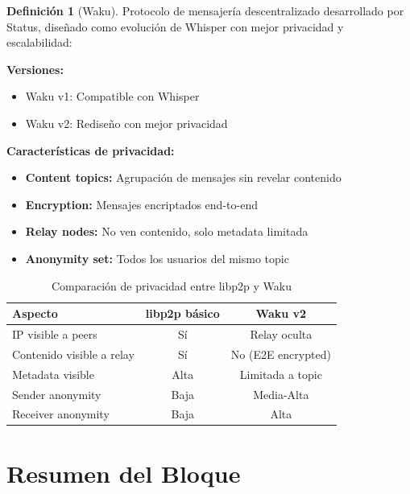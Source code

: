 \documentclass[11pt,a4paper,twoside]{book}
\theoremstyle{definition}
\newtheorem{definition}{Definición}[chapter]
\theoremstyle{remark}
\begin{document}
\begin{definition}[Waku]
Protocolo de mensajería descentralizado desarrollado por Status, diseñado como evolución de Whisper con mejor privacidad y escalabilidad:

\textbf{Versiones:}
\begin{itemize}
    \item Waku v1: Compatible con Whisper
    \item Waku v2: Rediseño con mejor privacidad
\end{itemize}

\textbf{Características de privacidad:}
\begin{itemize}
    \item \textbf{Content topics:} Agrupación de mensajes sin revelar contenido
    \item \textbf{Encryption:} Mensajes encriptados end-to-end
    \item \textbf{Relay nodes:} No ven contenido, solo metadata limitada
    \item \textbf{Anonymity set:} Todos los usuarios del mismo topic
\end{itemize}
\end{definition}

\begin{table}[htbp]
\centering
\small
\begin{tabular}{lcc}
\toprule
\textbf{Aspecto} & \textbf{libp2p básico} & \textbf{Waku v2} \\
\midrule
IP visible a peers & Sí & Relay oculta \\
Contenido visible a relay & Sí & No (E2E encrypted) \\
Metadata visible & Alta & Limitada a topic \\
Sender anonymity & Baja & Media-Alta \\
Receiver anonymity & Baja & Alta \\
\bottomrule
\end{tabular}
\caption{Comparación de privacidad entre libp2p y Waku}
\end{table}

\section*{Resumen del Bloque}
\end{document}
